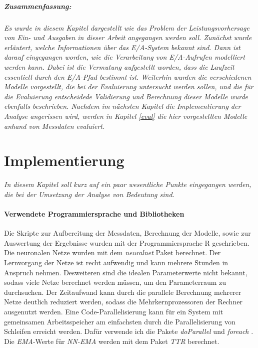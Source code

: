 \documentclass[
	12pt,
	a4paper,
	BCOR10mm,
	DIV14,
	listof=totoc,
	bibliography=totoc,
	headsepline
]{scrreprt}
\begin{document}
\paragraph{Zusammenfassung:}
\textit{
Es wurde in diesem Kapitel dargestellt wie das Problem der Leistungsvorhersage von Ein- und Ausgaben in dieser Arbeit angegangen werden soll.
Zunächst wurde erläutert, welche Informationen über das E/A-System bekannt sind. Dann ist darauf eingegangen worden, wie die Verarbeitung von E/A-Aufrufen modelliert werden kann. Dabei ist die Vermutung aufgestellt worden, dass die Laufzeit essentiell durch den E/A-Pfad bestimmt ist. 
Weiterhin wurden die verschiedenen Modelle vorgestellt, die bei der Evaluierung untersucht werden sollen, und die für die Evaluierung entscheidede Validierung und Berechnung dieser Modelle wurde ebenfalls beschrieben.
Nachdem im nächsten Kapitel die Implementierung der Analyse angerissen wird, werden in Kapitel \ref{eval} die hier vorgestellten Modelle anhand von Messdaten evaluiert.
}

\chapter{Implementierung}
\textit{%
In diesem Kapitel soll kurz auf ein paar wesentliche Punkte eingegangen werden, die bei der Umsetzung der Analyse von Bedeutung sind.
}
\bigskip

\subsubsection{Verwendete Programmiersprache und Bibliotheken}
Die Skripte zur Aufbereitung der Messdaten, Berechnung der Modelle, sowie zur Auswertung der Ergebnisse wurden mit der Programmiersprache R geschrieben.
Die neuronalen Netze wurden mit dem \textit{neuralnet} Paket \cite{gunther2010neuralnet} berechnet. Der Lernvorgang der Netze ist recht aufwendig und kann mehrere Stunden in Anspruch nehmen.
Desweiteren sind die idealen Parameterwerte nicht bekannt, sodass viele Netze berechnet werden müssen, um den Parameterraum zu durchsuchen.
Der Zeitaufwand kann durch die parallele Berechnung mehrerer Netze deutlich reduziert werden, sodass die Mehrkernprozessoren der Rechner ausgenutzt werden.
Eine Code-Parallelisierung kann für ein System mit gemeinsamen Arbeitsspeicher am einfachsten durch die Parallelisierung von Schleifen erreicht werden. Dafür verwende ich die Pakete \textit{doParallel} und \textit{foreach} \cite{weston2014getting}.
Die \textit{EMA}-Werte für \textit{NN-EMA} werden mit dem Paket \textit{TTR} berechnet.
\end{document}
